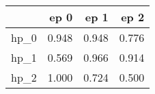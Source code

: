 \begin{tabular}{lrrr}
\toprule
{} &   ep 0 &   ep 1 &   ep 2 \\
\midrule
hp\_0 &  0.948 &  0.948 &  0.776 \\
hp\_1 &  0.569 &  0.966 &  0.914 \\
hp\_2 &  1.000 &  0.724 &  0.500 \\
\bottomrule
\end{tabular}
